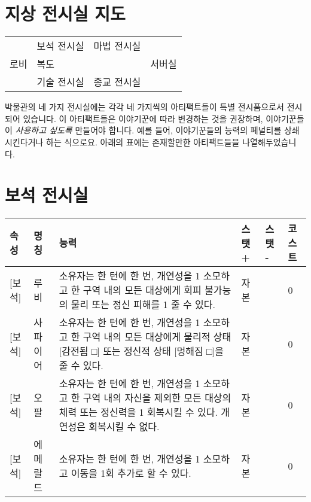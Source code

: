 \documentclass{report}
\begin{document}
	
	\section*{지상 전시실 지도}
	\begin{tabular}{|p{3cm}|p{3cm}|p{3cm}|p{3cm}|p{3cm}|p{3cm}|}
		\hline
		\multirow{5}{*}{로비} & \multicolumn{2}{p{3cm}|}{\multirow{2}{*}{보석 전시실}} & \multicolumn{2}{p{3cm}|}{\multirow{2}{*}{마법 전시실}} & \multirow{5}{*}{서버실} \\
		& \multicolumn{2}{p{3cm}|}{}                        & \multicolumn{2}{p{3cm}|}{}                        &                      \\ \cline{2-5}
		& \multicolumn{4}{p{6cm}|}{복도}                                                                     &                      \\ \cline{2-5}
		& \multicolumn{2}{p{3cm}|}{\multirow{2}{*}{기술 전시실}} & \multicolumn{2}{p{3cm}|}{\multirow{2}{*}{종교 전시실}} &                      \\
		& \multicolumn{2}{p{3cm}|}{}                        & \multicolumn{2}{c|}{}                        &                      \\ \hline
	\end{tabular}
	
	\bigskip
	
	박물관의 네 가지 전시실에는 각각 네 가지씩의 아티팩트들이 특별 전시품으로서 전시되어 있습니다. 이 아티팩트들은 이야기꾼에 따라 변경하는 것을 권장하며, 이야기꾼들이 \emph{사용하고 싶도록} 만들어야 합니다. 예를 들어, 이야기꾼들의 능력의 페널티를 상쇄시킨다거나 하는 식으로요. 아래의 표에는 존재할만한 아티팩트들을 나열해두었습니다.
	
	\section*{보석 전시실}
	\begin{tabularx}{\textwidth}{l|l|X|l|l|l}
		\textbf{속성} & \textbf{명칭} & \textbf{능력} & \textbf{스탯 +} & \textbf{스탯 -} & \textbf{코스트}\\ \hline \hline
		[저주][보석]& 루비   & 소유자는 한 턴에 한 번, 개연성을 1 소모하고 한 구역 내의 모든 대상에게 회피 불가능의 물리 또는 정신 피해를 1 줄 수 있다.   & 자본     & & 0    \\ \hline
		[저주][보석]& 사파이어   & 소유자는 한 턴에 한 번, 개연성을 1 소모하고 한 구역 내의 모든 대상에게 물리적 상태 [감전됨 □] 또는 정신적 상태 [멍해짐 □]을 줄 수 있다.   & 자본     & & 0    \\ \hline
		[저주][보석]& 오팔   &  소유자는 한 턴에 한 번, 개연성을 1 소모하고 한 구역 내의 자신을 제외한 모든 대상의 체력 또는 정신력을 1 회복시킬 수 있다. 개연성은 회복시킬 수 없다.  & 자본     & & 0    \\ \hline
		[저주][보석]& 에메랄드   & 소유자는 한 턴에 한 번, 개연성을 1 소모하고 이동을 1회 추가로 할 수 있다.   & 자본     & & 0    \\ 
	\end{tabularx}
	
\end{document}
